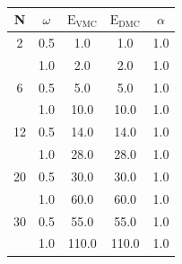 \begin{table}
\begin{center}
\label{tab:noColValid}
\begin{tabular}{cc|ccc}
    N     & $\omega$ & $\mathrm{E_{VMC}}$ & $\mathrm{E_{DMC}}$ & $\alpha$ \\
\hline
    2     &   0.5    &   1.0    &   1.0    &   1.0    \\
          &   1.0    &   2.0    &   2.0    &   1.0    \\
    6     &   0.5    &   5.0    &   5.0    &   1.0    \\
          &   1.0    &   10.0   &   10.0   &   1.0    \\
    12    &   0.5    &   14.0   &   14.0   &   1.0    \\
          &   1.0    &   28.0   &   28.0   &   1.0    \\
    20    &   0.5    &   30.0   &   30.0   &   1.0    \\
          &   1.0    &   60.0   &   60.0   &   1.0    \\
    30    &   0.5    &   55.0   &   55.0   &   1.0    \\
          &   1.0    &  110.0   &  110.0   &   1.0    \\
\end{tabular}
\caption{}
\end{center}
\end{table}

